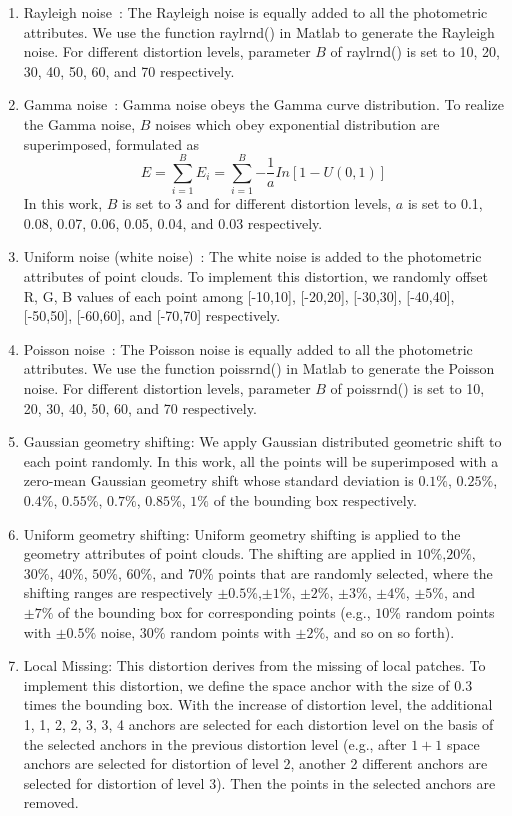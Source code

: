 \documentclass[acmsmall]{acmart}
\begin{document}
\begin{enumerate}
  \item {\sf Rayleigh noise~\cite{Boyat2015ImageNoise}}: The Rayleigh noise is equally added to all the photometric attributes. We use the function raylrnd() in Matlab to generate the Rayleigh noise. For different distortion levels, parameter $B$ of raylrnd() is set to 10, 20, 30, 40, 50, 60, and 70 respectively.
  \item {\sf Gamma noise~\cite{Boyat2015ImageNoise}}: Gamma noise obeys the Gamma curve distribution. To realize the Gamma noise, $B$ noises which obey exponential distribution are superimposed, formulated as \[E = \sum\limits_{i = 1}^B {{E_i}}  = \sum\limits_{i = 1}^B { - \frac{1}{a}In[1 - U(0,1)]} \]
      In this work, $B$ is set to 3 and for different distortion levels, $a$ is set to 0.1, 0.08, 0.07, 0.06, 0.05, 0.04, and 0.03 respectively.
  \item {\sf Uniform noise (white noise)~\cite{Boyat2015ImageNoise,Ponomarenko2015TID2013}}: The white noise is added to the photometric attributes of point clouds. To implement this distortion, we randomly offset R, G, B values of each point among [-10,10], [-20,20], [-30,30], [-40,40], [-50,50], [-60,60], and [-70,70] respectively.
  \item {\sf Poisson noise~\cite{Boyat2015ImageNoise}}: The Poisson noise is equally added to all the photometric attributes. We use the function poissrnd() in Matlab to generate the Poisson noise. For different distortion levels, parameter $B$ of poissrnd() is set to 10, 20, 30, 40, 50, 60, and 70 respectively.
  \item {\sf Gaussian geometry shifting}: We apply Gaussian distributed geometric shift to each point randomly. In this work, all the points will be superimposed with a zero-mean Gaussian geometry shift whose standard deviation is $0.1\%$, $0.25\%$, $0.4\%$, $0.55\%$, $0.7\%$, $0.85\%$, $1\%$ of the bounding box respectively.
  \item {\sf Uniform geometry shifting}: Uniform geometry shifting is applied to the geometry attributes of point clouds. The shifting are applied in $10\%$,$20\%$, $30\%$, $40\%$, $50\%$, $60\%$, and $70\%$ points that are randomly selected, where the shifting ranges are respectively $\pm0.5\%$,$\pm1\%$, $\pm2\%$, $\pm3\%$, $\pm4\%$, $\pm5\%$, and $\pm7\%$ of the bounding box for corresponding points (e.g., $10\%$ random points with $\pm0.5\%$ noise,  $30\%$ random points with $\pm2\%$, and so on so forth).
  \item {\sf Local Missing}: This distortion derives from the missing of local patches. To implement this distortion, we define the space anchor with the size of 0.3 times the bounding box. With the increase of distortion level, the additional 1, 1, 2, 2, 3, 3, 4 anchors are selected for each distortion level on the basis of the selected anchors in the previous distortion level (e.g., after $1+1$ space anchors are selected for distortion of level 2, another 2 different anchors are selected for distortion of level 3). Then the points in the selected anchors are removed.

\end{enumerate}
\end{document}
